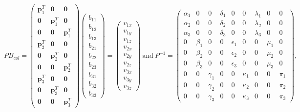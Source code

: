 \documentclass[12pt]{article}
\begin{document}
\begin{equation*}
PB_{col} = 
\begin{pmatrix}
 \mathbf{p}_1^T & \mathbf{0} & \mathbf{0} \\ 
 \mathbf{0} & \mathbf{p}_1^T & \mathbf{0}\\ 
 \mathbf{0} & \mathbf{0} & \mathbf{p}_1^T \\
  \mathbf{p}_2^T & \mathbf{0} & \mathbf{0} \\ 
 \mathbf{0} & \mathbf{p}_2^T & \mathbf{0}\\ 
 \mathbf{0} & \mathbf{0} & \mathbf{p}_2^T \\
  \mathbf{p}_3^T & \mathbf{0} & \mathbf{0} \\ 
 \mathbf{0} & \mathbf{p}_3^T & \mathbf{0}\\ 
 \mathbf{0} & \mathbf{0} & \mathbf{p}_3^T 
\end{pmatrix}
\begin{pmatrix}
b_{11} \\
b_{12} \\
b_{13} \\
b_{21} \\
b_{22} \\
b_{23} \\
b_{31} \\
b_{32} \\
b_{33}
\end{pmatrix} =
\begin{pmatrix} 
v_{1x} \\
v_{1y} \\
v_{1z} \\
v_{2x} \\
v_{2y} \\
v_{2z} \\
v_{3x} \\
v_{3y} \\
v_{3z}
\end{pmatrix} ~
\text{and} ~
P^{-1} = 
\begin{pmatrix}
\alpha_1 & 0 & 0 & \delta_1 & 0 & 0 & \lambda_1 & 0 & 0 \\
\alpha_2 & 0 & 0 & \delta_2 & 0 & 0 & \lambda_2 & 0 & 0 \\
\alpha_3 & 0 & 0 & \delta_3 & 0 & 0 & \lambda_3 & 0 & 0 \\
0 & \beta_1 & 0 & 0 & \epsilon_1 & 0 & 0 & \mu_1 & 0 \\
0 & \beta_2 & 0 & 0 & \epsilon_2 & 0 & 0 & \mu_2 & 0 \\
0 & \beta_3 & 0 & 0 & \epsilon_3 & 0 & 0 & \mu_3 & 0 \\
0 & 0 & \gamma_1 & 0 & 0 & \kappa_1 & 0 & 0 & \pi_1 \\
0 & 0 & \gamma_2 & 0 & 0 & \kappa_2 & 0 & 0 & \pi_2  \\
0 & 0 & \gamma_3 & 0 & 0 & \kappa_3 & 0 & 0 & \pi_3
\end{pmatrix},
\end{equation*}
\end{document}
